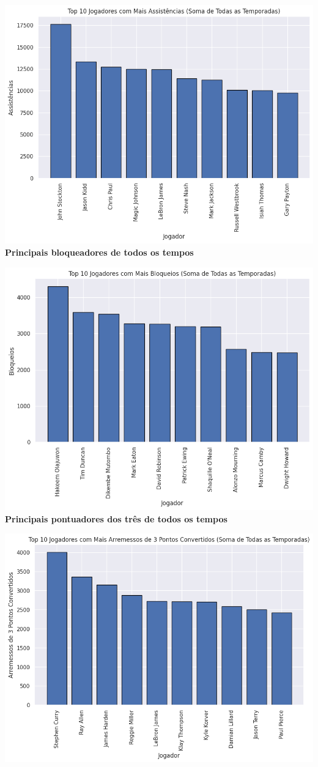 \documentclass[
]{book}
\begin{document}
\includegraphics{imagens/17.png} \textbf{Principais bloqueadores de todos os tempos}

\includegraphics{imagens/18.png} \textbf{Principais pontuadores dos três de todos os tempos}

\includegraphics{imagens/19.png}
\end{document}
